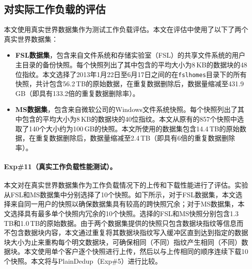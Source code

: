 \subsection{对实际工作负载的评估}
\label{subsec:sgxdedup-real-world}

本文使用真实世界数据集作为测试工作负载评估\sysnameS。本文在评估中使用了以下了两个真实世界数据集：

\begin{itemize}
    \item \textbf{FSL数据集}，包含来自文件系统和存储实验室（FSL）\cite{fsl,sun16}的共享文件系统的用户主目录的备份快照。每个快照列出了其中包含的平均大小为8\,KB的数据块的48位指纹。本文选择了2013年1月22日至6月17日之间的在\texttt{fslhomes}目录下的所有快照，共计包含56.2\,TB的原始数据，在重复数据删除后，数据量缩减至431.9\,GB（即具有133.2倍的重复数据删除率）。
    \item \textbf{MS数据集}，包含来自微软公司\cite{meyer2011deduplication}的Windows文件系统快照。每个快照列出了其中包含的平均大小为8\,KB的数据块的40位指纹。本文从原有的857个快照中选取了140个大小约为100\,GB的快照。本文所使用的数据集包含14.4\,TB的原始数据，在重复数据删除后，数据量缩减至2.4\,TB（即具有6倍的重复数据删除率）。
\end{itemize}

\paragraph*{Exp\#11（真实工作负载性能测试）。} 本文对\sysnameS 在真实世界数据集作为工作负载情况下的上传和下载性能进行了评估。实验从FSL和MS数据集中分别选择了10个快照。如下所示，对于FSL数据集，本文选择来自同一用户的快照以确保数据集具有较高的跨快照冗余；对于MS数据集，本文选择具有最多单个快照内冗余的10个快照。选择的FSL和MS快照分别包含1.3\,TB和1.0\,TB的原始数据。由于两个数据集提供的快照只包含数据块指纹等信息而不包含数据块内容，本文通过重复将其数据块指纹写入缓冲区直到达到指定的数据块大小为止来重构每个明文数据块，可确保相同（不同）指纹产生相同（不同）数据块。本文使用单个客户逐个快照进行上传，然后以与上传相同的顺序连续下载10个快照。本文将\sysnameS 与PlainDedup（Exp\#5）进行比较。

